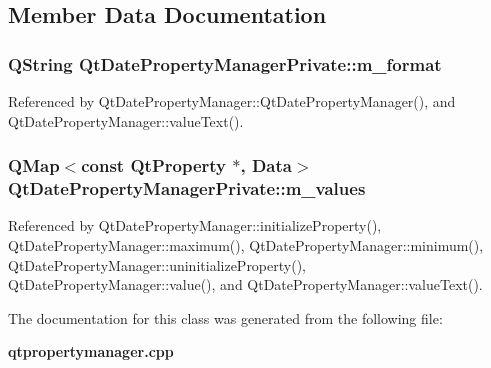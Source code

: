 \subsection{Member Data Documentation}
\subsubsection[{m\+\_\+format}]{\setlength{\rightskip}{0pt plus 5cm}Q\+String Qt\+Date\+Property\+Manager\+Private\+::m\+\_\+format}\label{classQtDatePropertyManagerPrivate_a99084506c65bfc31b777442a0df3c8ad}


Referenced by Qt\+Date\+Property\+Manager\+::\+Qt\+Date\+Property\+Manager(), and Qt\+Date\+Property\+Manager\+::value\+Text().

\subsubsection[{m\+\_\+values}]{\setlength{\rightskip}{0pt plus 5cm}Q\+Map$<$const {\bf Qt\+Property} $\ast$, {\bf Data}$>$ Qt\+Date\+Property\+Manager\+Private\+::m\+\_\+values}\label{classQtDatePropertyManagerPrivate_a25b4fc13c4c8f345df74eaacdaf489dd}


Referenced by Qt\+Date\+Property\+Manager\+::initialize\+Property(), Qt\+Date\+Property\+Manager\+::maximum(), Qt\+Date\+Property\+Manager\+::minimum(), Qt\+Date\+Property\+Manager\+::uninitialize\+Property(), Qt\+Date\+Property\+Manager\+::value(), and Qt\+Date\+Property\+Manager\+::value\+Text().



The documentation for this class was generated from the following file\+:\begin{DoxyCompactItemize}
\item 
{\bf qtpropertymanager.\+cpp}\end{DoxyCompactItemize}
